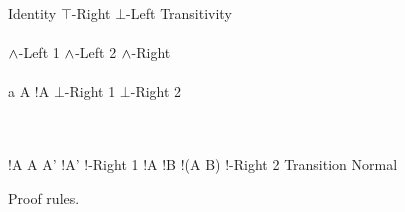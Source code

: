 \begin{FIGURE}
\begin{RULES}

  \ZEROPREMISERULENAMEDRIGHT
  {
    \phi \judge \phi
  }{Identity}
    \quad
  \ZEROPREMISERULENAMEDRIGHT
  {
    \phi \judge \top
  }{$\top$-Right}
    \quad
  \ZEROPREMISERULENAMEDRIGHT
  {
    \bot \judge \phi
  }{$\bot$-Left}
    \quad
  \TWOPREMISERULENAMEDRIGHT
  {
    \phi \judge \psi
  }
  {
    \psi \judge \xi
  }
  {
    \phi \judge \xi
  }{Transitivity}
    \\\\
  \ONEPREMISERULENAMEDRIGHT
  {
    \phi \judge \psi
  }
  {
    \phi \AND \xi \judge \psi
  }{$\land$-Left 1}
     \quad
  \ONEPREMISERULENAMEDRIGHT
  {
    \phi \judge \psi
  }
  {
    \xi \AND \phi  \judge \psi
  }{$\land$-Left 2}
     \quad
  \TWOPREMISERULENAMEDRIGHT
  {
    \phi \judge \psi
  }
  {
    \phi \judge \xi
  }
  {
    \phi \judge \psi \AND \xi
  }{$\land$-Right}
     \\\\
     \ONEPREMISERULENAMEDRIGHT
     {
       a \notin A
     }
     {
       !A \AND {} \judge \bot
     }{$\bot$-Right 1}
        \quad
     \ZEROPREMISERULENAMEDRIGHT
     {
        \judge \bot
     }{$\bot$-Right 2}

     \\\\
     \TWOPREMISERULENAMEDRIGHT
     {
       \phi \judge !A
     }
     {
       A \subseteq A'
     }
     {
       \phi \judge!A'
     }{!-Right 1}
     \quad
     \TWOPREMISERULENAMEDRIGHT
     {
       \phi \judge !A
     }
     {
       \phi \judge !B
     }
     {
       \phi \judge !(A \cap B)
     }{!-Right 2}
     \quad
     \ONEPREMISERULENAMEDRIGHT
     {
       \phi \judge \psi
     }
     {
        \judge {}
     }{Transition Normal}
\end{RULES}
\caption{Proof rules.}\label{figure:elAndBangRules}
\end{FIGURE}

